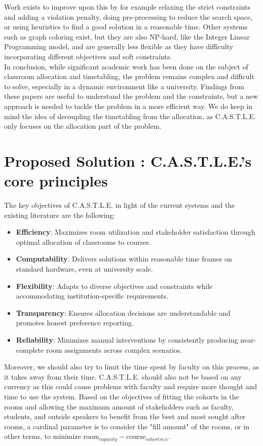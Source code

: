 \documentclass[a4paper, oneside]{article}
\theoremstyle{plain}
\newcommand{\castle}{C{\small.}A{\small.}S{\small.}T{\small.}L{\small.}E{\small.}}
\begin{document}
Work exists to improve upon this by for example relaxing the strict constraints and adding a violation penalty, doing pre-processing to reduce the search space, or using heuristics to find a good solution in a reasonable time.
Other systems such as graph coloring exist, but they are also NP-hard, like the Integer Linear Programming model, and are generally less flexible as they have difficulty incorporating different objectives and soft constraints.\\

In conclusion, while significant academic work has been done on the subject of classroom allocation and timetabling, the problem remains complex and difficult to solve, especially in a dynamic environment like a university. Findings
from these papers are useful to understand the problem and the constraints, but a new approach is needed to tackle the problem in a more efficient way. We do keep in mind the idea of decoupling the
timetabling from the allocation, as \castle{} only focuses on the allocation part of the problem.

\section{Proposed Solution : \castle{}'s core principles}

The key objectives of \castle{} in light of the current systems and the existing literature are the following:
\begin{itemize}
	\item \textbf{Efficiency}: Maximizes room utilization and stakeholder satisfaction through optimal allocation of classrooms to courses.
	\item \textbf{Computability}: Delivers solutions within reasonable time frames on standard hardware, even at university scale.
	\item \textbf{Flexibility}: Adapts to diverse objectives and constraints while accommodating institution-specific requirements.
	\item \textbf{Transparency}: Ensures allocation decisions are understandable and promotes honest preference reporting.
	\item \textbf{Reliability}: Minimizes manual interventions by consistently producing near-complete room assignments across complex scenarios.
\end{itemize}

Moreover, we should also try to limit the time spent by faculty on this process, as it takes away from their time. \castle{} should also
not be based on any currency as this could cause problems with faculty and require more thought and time to use the system.
Based on the objectives of fitting the cohorts in the rooms and allowing the maximum amount of stakeholders such as faculty, students, and outside speakers
to benefit from the best and most sought after rooms, a cardinal parameter is to consider the "fill amount" of the rooms, or in other terms, to minimize
$\text{room}_{capacity} - \text{course}_{cohort size}$.
\end{document}
